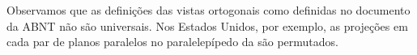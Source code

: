 \begin{observation}


Observamos que as definições das vistas ortogonais como definidas no documento da ABNT não são universais. Nos Estados Unidos, por exemplo, as projeções em cada par de planos paralelos no paralelepípedo da {\hyperref[\detokenize{GE301-6:fig-proj-vistas-ortogonais-06}]{}} são permutados.
\end{observation}

